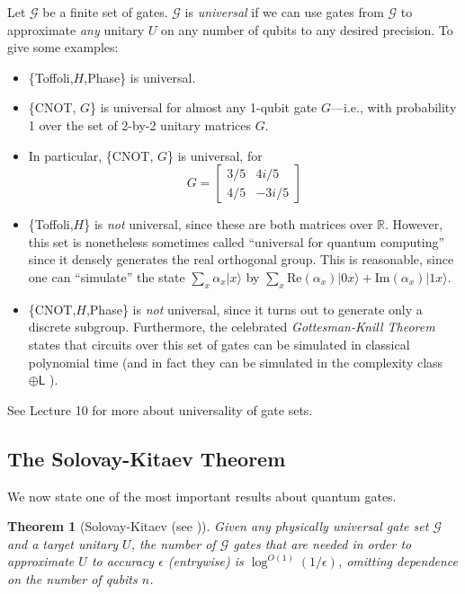 \documentclass[11pt]{report}
\theoremstyle{plain}
\newtheorem{theorem}{Theorem}[section]
\theoremstyle{definition}
\newcommand{\R}{{\mathbb R}}
\renewcommand{\ket}[1]{|#1\rangle}
\begin{document}
Let $\mathcal{G}$ be a finite set of gates.
$\mathcal{G}$ is {\em universal} if we can use gates from $\mathcal{G}$ to
approximate {\em any} unitary $U$ on any number of qubits to any
desired precision.  To give some examples:

\begin{itemize}
\item \{Toffoli,$H$,Phase\} is universal.
\item \{CNOT, $G$\} is universal for almost any 1-qubit gate $G$---i.e., with
probability 1 over the set of 2-by-2 unitary matrices $G$.
\item In particular, \{CNOT, $G$\} is universal, for
$$G =
\left[
\begin{array}{cc}
3/5 & 4i/5 \\
4/5 & -3i/5
\end{array}
\right]
$$
\item \{Toffoli,$H$\} is {\em not} universal, since these are both matrices
over $\R$.  However, this set is nonetheless sometimes called
``universal for quantum computing'' since it densely generates the real
orthogonal group.  This is reasonable, since one can ``simulate''
the state
$\sum_x \alpha_x \ket{x}$ by
$\sum_x \mathrm{Re}(\alpha_x)\ket{0x} + \mathrm{Im}(\alpha_x)\ket{1x}$.

\item \{CNOT,$H$,Phase\} is {\em not} universal, since it turns out to generate only a
discrete subgroup.  Furthermore, the celebrated \emph{Gottesman-Knill Theorem} states
that circuits over this set of gates can be simulated in classical polynomial time
(and in fact they can be simulated in the complexity class $\mathsf{\oplus L}$ \cite{ag}).
\end{itemize}

See Lecture 10 for more about universality of gate sets.

\subsection{The Solovay-Kitaev Theorem}

We now state one of the most important results about quantum gates.

\begin{theorem}[Solovay-Kitaev (see \cite{solovaykitaev})]
Given any physically universal gate set $\mathcal{G}$ and a target unitary $U$, the
number of $\mathcal{G}$ gates that are needed in order to approximate $U$ to
accuracy $\epsilon$ (entrywise) is $\log^{O(1)}(1/\epsilon)$, omitting dependence on the
number of qubits $n$.
\end{theorem}
\end{document}
